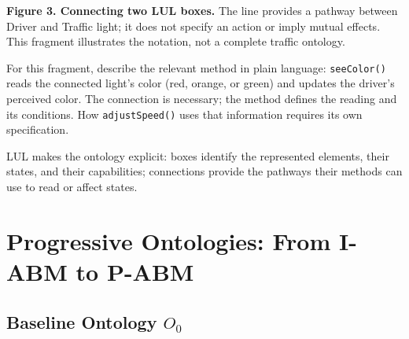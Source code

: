 \documentclass[11pt,a4paper]{article}
\newcommand{\stereo}[1]{\texttt{\guillemotleft #1\guillemotright}}
\begin{document}
\begin{center}
\end{center}
{\small\textbf{Figure 3. Connecting two LUL boxes.} The line provides a pathway between Driver and Traffic light; it does not specify an action or imply mutual effects. This fragment illustrates the notation, not a complete traffic ontology.}

For this fragment, describe the relevant method in plain language: \texttt{seeColor()} reads the connected light's color (red, orange, or green) and updates the driver's perceived color. The connection is necessary; the method defines the reading and its conditions. How \texttt{adjustSpeed()} uses that information requires its own specification.

LUL makes the ontology explicit: boxes identify the represented elements, their states, and their capabilities; connections provide the pathways their methods can use to read or affect states.

\clearpage
\section{Progressive Ontologies: From I-ABM to P-ABM}

\subsection{Baseline Ontology \(O_0\)}
\end{document}
